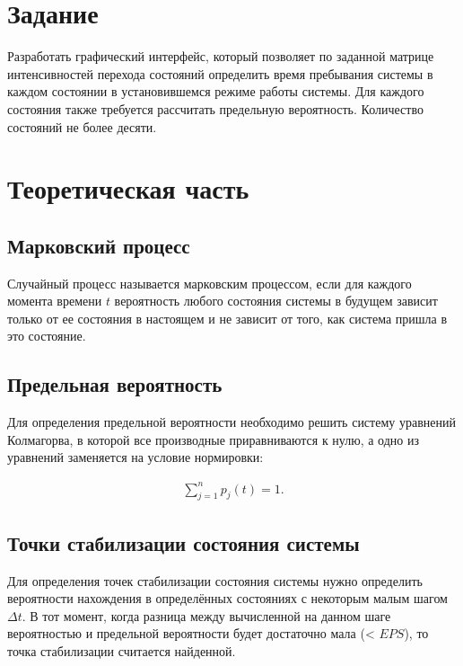 \chapter{Задание}

Разработать графический интерфейс, который позволяет по заданной
матрице интенсивностей перехода состояний определить время пребывания
системы в каждом состоянии в установившемся режиме работы системы.
Для каждого состояния также требуется рассчитать предельную вероятность.
Количество состояний не более десяти.

\chapter{Теоретическая часть}

\section{Марковский процесс}

Случайный процесс называется марковским процессом, если для каждого момента времени $t$ вероятность любого состояния системы в будущем зависит только от ее состояния в настоящем и не зависит от того, как система пришла в это состояние.

\section{Предельная вероятность}

Для определения предельной вероятности необходимо решить систему уравнений Колмагорва, в которой все производные приравниваются к нулю, а одно из уравнений заменяется на условие нормировки:

\begin{equation}
    \begin{aligned}
        \sum_{j = 1}^{n} p_{j}(t) = 1.
    \end{aligned}
\end{equation}

\section{Точки стабилизации состояния системы}

Для определения точек стабилизации состояния системы нужно определить вероятности нахождения в определённых состояниях с некоторым малым шагом $\Delta t$. В тот момент, когда разница между вычисленной на данном шаге вероятностью и предельной вероятности будет достаточно мала (< $EPS$), то точка стабилизации считается найденной.


